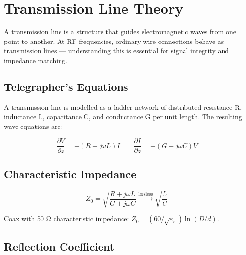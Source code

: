 \section{Transmission Line Theory}\label{sec:wiki_transmission_lines}



A transmission line is a structure that guides electromagnetic waves from one point to another. At RF frequencies, ordinary wire connections behave as transmission lines — understanding this is essential for signal integrity and impedance matching.

				

\subsection{Telegrapher's Equations}

				


				

A transmission line is modelled as a ladder network of distributed resistance R, inductance L, capacitance C, and conductance G per unit length. The resulting wave equations are:


				
\[\dfrac{\partial V}{\partial z} = -(R+j\omega L)I \qquad \dfrac{\partial I}{\partial z} = -(G+j\omega C)V\]

				

\subsection{Characteristic Impedance}

				
\[Z_0 = \sqrt{\dfrac{R+j\omega L}{G+j\omega C}} \xrightarrow{\text{lossless}} \sqrt{\dfrac{L}{C}}\]

				

Coax with 50 Ω characteristic impedance: $Z_0 = (60/\sqrt{\varepsilon_r})\ln(D/d)$.

				

\subsection{Reflection Coefficient}

